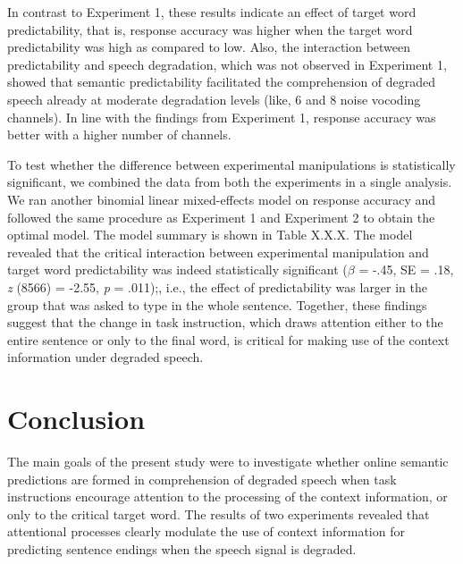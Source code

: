 \documentclass[a4paper, nobind]{templates/ociamthesis}
\begin{document}
In contrast to Experiment 1, these results indicate an effect of target word predictability, that is, response accuracy was higher when the target word predictability was high as compared to low.
Also, the interaction between predictability and speech degradation, which was not observed in Experiment 1, showed that semantic predictability facilitated the comprehension of degraded speech already at moderate degradation levels (like, 6 and 8 noise vocoding channels).
In line with the findings from Experiment 1, response accuracy was better with a higher number of channels.

To test whether the difference between experimental manipulations is statistically significant, we combined the data from both the experiments in a single analysis.
We ran another binomial linear mixed-effects model on response accuracy and followed the same procedure as Experiment 1 and Experiment 2 to obtain the optimal model.
The model summary is shown in Table X.X.X.
The model revealed that the critical interaction between experimental manipulation and target word predictability was indeed statistically significant (\(\beta\) = -.45, SE = .18, \emph{z} (8566) = -2.55, \emph{p} = .011);, i.e., the effect of predictability was larger in the group that was asked to type in the whole sentence.
Together, these findings suggest that the change in task instruction, which draws attention either to the entire sentence or only to the final word, is critical for making use of the context information under degraded speech.

\hypertarget{conclusion}{%
\section{Conclusion}\label{conclusion}}

The main goals of the present study were to investigate whether online semantic predictions are formed in comprehension of degraded speech when task instructions encourage attention to the processing of the context information, or only to the critical target word.
The results of two experiments revealed that attentional processes clearly modulate the use of context information for predicting sentence endings when the speech signal is degraded.
\end{document}
